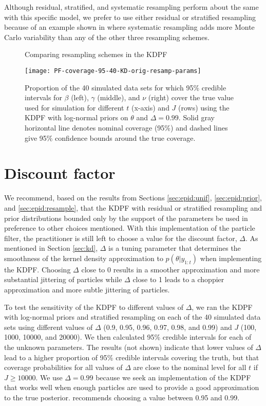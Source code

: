 Although residual, stratified, and systematic resampling perform about the same with this specific model, we prefer to use either residual or stratified resampling because of an example shown in \cite{Douc:Capp:Moul:comp:2005} where systematic resampling adds more Monte Carlo variability than any of the other three resampling schemes.

\begin{figure}
\ssp
\centering
\caption{Comparing resampling schemes in the KDPF} \label{fig:epid:resamp}
\texttt{[image: PF-coverage-95-40-KD-orig-resamp-params]}
\caption*{Proportion of the 40 simulated data sets for which 95\% credible intervals for $\beta$ (left), $\gamma$ (middle), and $\nu$ (right) cover the true value used for simulation for different $t$ (x-axis) and $J$ (rows) using the KDPF with log-normal priors on $\theta$ and $\Delta = 0.99$. Solid gray horizontal line denotes nominal coverage (95\%) and dashed lines give 95\% confidence bounds around the true coverage.}
\end{figure}

\section{Discount factor}

We recommend, based on the results from Sections \ref{sec:epid:unif}, \ref{sec:epid:prior}, and \ref{sec:epid:resample}, that the KDPF with residual or stratified resampling and prior distributions bounded only by the support of the parameters be used in preference to other choices mentioned. With this implementation of the particle filter, the practitioner is still left to choose a value for the discount factor, $\Delta$. As mentioned in Section \ref{sec:kd}, $\Delta$ is a tuning parameter that determines the smoothness of the kernel density approximation to $p(\theta|y_{1:t})$ when implementing the KDPF. Choosing $\Delta$ close to 0 results in a smoother approximation and more substantial jittering of particles while $\Delta$ close to 1 leads to a choppier approximation and more subtle jittering of particles.

To test the sensitivity of the KDPF to different values of $\Delta$, we ran the KDPF with log-normal priors and stratified resampling on each of the 40 simulated data sets using different values of $\Delta$ (0.9, 0.95, 0.96, 0.97, 0.98, and 0.99) and $J$ (100, 1000, 10000, and 20000). We then calculated 95\% credible intervals for each of the unknown parameters. The results (not shown) indicate that lower values of $\Delta$ lead to a higher proportion of 95\% credible intervals covering the truth, but that coverage probabilities for all values of $\Delta$ are close to the nominal level for all $t$ if $J \ge 10000$. We use $\Delta = 0.99$ because we seek an implementation of the KDPF that works well when enough particles are used to provide a good approximation to the true posterior. \citet{Liu:West:comb:2001} recommends choosing a value between 0.95 and 0.99.

